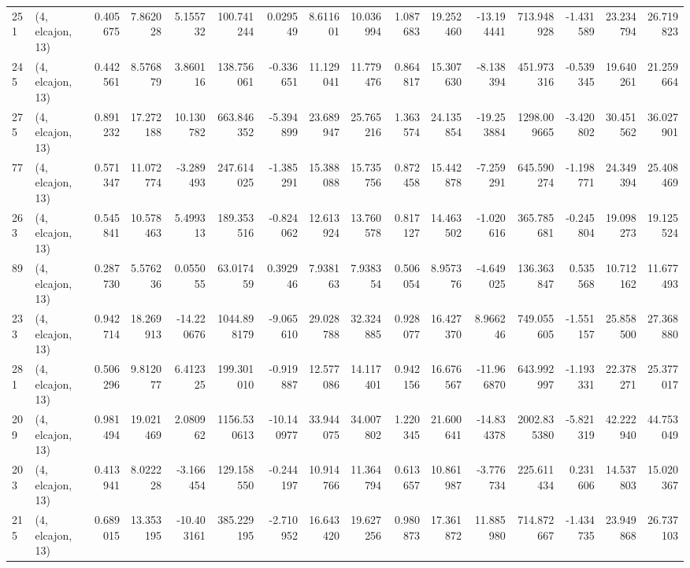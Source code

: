 \begin{tabular}{llrrrrrrrrrrrrrr}
251 &  (4, elcajon, 13) &   0.405675 &   7.862028 &   5.155732 &   100.741244 &   0.029549 &   8.611601 &  10.036994 &  1.087683 &  19.252460 & -13.194441 &   713.948928 &  -1.431589 &  23.234794 &  26.719823 \\
245 &  (4, elcajon, 13) &   0.442561 &   8.576879 &   3.860116 &   138.756061 &  -0.336651 &  11.129041 &  11.779476 &  0.864817 &  15.307630 &  -8.138394 &   451.973316 &  -0.539345 &  19.640261 &  21.259664 \\
275 &  (4, elcajon, 13) &   0.891232 &  17.272188 &  10.130782 &   663.846352 &  -5.394899 &  23.689947 &  25.765216 &  1.363574 &  24.135854 & -19.253884 &  1298.009665 &  -3.420802 &  30.451562 &  36.027901 \\
77  &  (4, elcajon, 13) &   0.571347 &  11.072774 &  -3.289493 &   247.614025 &  -1.385291 &  15.388088 &  15.735756 &  0.872458 &  15.442878 &  -7.259291 &   645.590274 &  -1.198771 &  24.349394 &  25.408469 \\
263 &  (4, elcajon, 13) &   0.545841 &  10.578463 &   5.499313 &   189.353516 &  -0.824062 &  12.613924 &  13.760578 &  0.817127 &  14.463502 &  -1.020616 &   365.785681 &  -0.245804 &  19.098273 &  19.125524 \\
89  &  (4, elcajon, 13) &   0.287730 &   5.576236 &   0.055055 &    63.017459 &   0.392946 &   7.938163 &   7.938354 &  0.506054 &   8.957376 &  -4.649025 &   136.363847 &   0.535568 &  10.712162 &  11.677493 \\
233 &  (4, elcajon, 13) &   0.942714 &  18.269913 & -14.220676 &  1044.898179 &  -9.065610 &  29.028788 &  32.324885 &  0.928077 &  16.427370 &   8.966246 &   749.055605 &  -1.551157 &  25.858500 &  27.368880 \\
281 &  (4, elcajon, 13) &   0.506296 &   9.812077 &   6.412325 &   199.301010 &  -0.919887 &  12.577086 &  14.117401 &  0.942156 &  16.676567 & -11.966870 &   643.992997 &  -1.193331 &  22.378271 &  25.377017 \\
209 &  (4, elcajon, 13) &   0.981494 &  19.021469 &   2.080962 &  1156.530613 & -10.140977 &  33.944075 &  34.007802 &  1.220345 &  21.600641 & -14.834378 &  2002.835380 &  -5.821319 &  42.222940 &  44.753049 \\
203 &  (4, elcajon, 13) &   0.413941 &   8.022228 &  -3.166454 &   129.158550 &  -0.244197 &  10.914766 &  11.364794 &  0.613657 &  10.861987 &  -3.776734 &   225.611434 &   0.231606 &  14.537803 &  15.020367 \\
215 &  (4, elcajon, 13) &   0.689015 &  13.353195 & -10.403161 &   385.229195 &  -2.710952 &  16.643420 &  19.627256 &  0.980873 &  17.361872 &  11.885980 &   714.872667 &  -1.434735 &  23.949868 &  26.737103 \\

\end{tabular}
